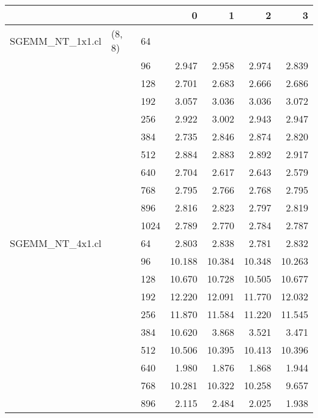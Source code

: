 \begin{tabular}{lllrrrr}
\toprule
                &        &      &       0 &       1 &       2 &       3 \\
\midrule
SGEMM\_NT\_1x1.cl & (8, 8) & 64   &         &         &         &         \\
                &        & 96   &   2.947 &   2.958 &   2.974 &   2.839 \\
                &        & 128  &   2.701 &   2.683 &   2.666 &   2.686 \\
                &        & 192  &   3.057 &   3.036 &   3.036 &   3.072 \\
                &        & 256  &   2.922 &   3.002 &   2.943 &   2.947 \\
                &        & 384  &   2.735 &   2.846 &   2.874 &   2.820 \\
                &        & 512  &   2.884 &   2.883 &   2.892 &   2.917 \\
                &        & 640  &   2.704 &   2.617 &   2.643 &   2.579 \\
                &        & 768  &   2.795 &   2.766 &   2.768 &   2.795 \\
                &        & 896  &   2.816 &   2.823 &   2.797 &   2.819 \\
                &        & 1024 &   2.789 &   2.770 &   2.784 &   2.787 \\
SGEMM\_NT\_4x1.cl &        & 64   &   2.803 &   2.838 &   2.781 &   2.832 \\
                &        & 96   &  10.188 &  10.384 &  10.348 &  10.263 \\
                &        & 128  &  10.670 &  10.728 &  10.505 &  10.677 \\
                &        & 192  &  12.220 &  12.091 &  11.770 &  12.032 \\
                &        & 256  &  11.870 &  11.584 &  11.220 &  11.545 \\
                &        & 384  &  10.620 &   3.868 &   3.521 &   3.471 \\
                &        & 512  &  10.506 &  10.395 &  10.413 &  10.396 \\
                &        & 640  &   1.980 &   1.876 &   1.868 &   1.944 \\
                &        & 768  &  10.281 &  10.322 &  10.258 &   9.657 \\
                &        & 896  &   2.115 &   2.484 &   2.025 &   1.938 \\

\end{tabular}
